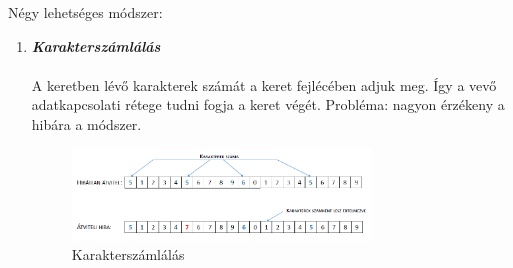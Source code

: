 \documentclass[12pt]{article}
\begin{document}
        \noindent Négy lehetséges módszer:
        \begin{enumerate}
            \item \emph{\textbf{Karakterszámlálás}} \\\\
            A keretben lévő karakterek számát a keret fejlécében adjuk meg. Így a vevő adatkapcsolati rétege tudni fogja a keret végét. Probléma: nagyon érzékeny a hibára a módszer.
            \begin{figure}[H]
                \centering
                \includegraphics[width=0.75\textwidth]{img/karakterszamlalas.png}
                \caption{Karakterszámlálás}	
            \end{figure}


\end{enumerate}
\end{document}
